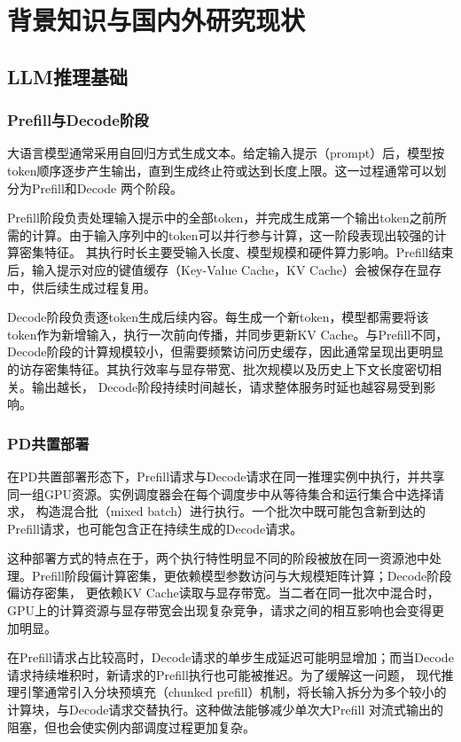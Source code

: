 
\chapter{背景知识与国内外研究现状}
\label{ch:background}

\section{LLM推理基础}

\subsection{Prefill与Decode阶段}

大语言模型通常采用自回归方式生成文本。给定输入提示（prompt）后，模型按token顺序逐步产生输出，直到生成终止符或达到长度上限。这一过程通常可以划分为Prefill和Decode
两个阶段。

Prefill阶段负责处理输入提示中的全部token，并完成生成第一个输出token之前所需的计算。由于输入序列中的token可以并行参与计算，这一阶段表现出较强的计算密集特征。
其执行时长主要受输入长度、模型规模和硬件算力影响。Prefill结束后，输入提示对应的键值缓存（Key-Value Cache，KV Cache）会被保存在显存中，供后续生成过程复用。

Decode阶段负责逐token生成后续内容。每生成一个新token，模型都需要将该token作为新增输入，执行一次前向传播，并同步更新KV Cache。与Prefill不同，
Decode阶段的计算规模较小，但需要频繁访问历史缓存，因此通常呈现出更明显的访存密集特征。其执行效率与显存带宽、批次规模以及历史上下文长度密切相关。输出越长，
Decode阶段持续时间越长，请求整体服务时延也越容易受到影响。

\subsection{PD共置部署}

在PD共置部署形态下，Prefill请求与Decode请求在同一推理实例中执行，并共享同一组GPU资源。实例调度器会在每个调度步中从等待集合和运行集合中选择请求，
构造混合批（mixed batch）进行执行。一个批次中既可能包含新到达的Prefill请求，也可能包含正在持续生成的Decode请求。

这种部署方式的特点在于，两个执行特性明显不同的阶段被放在同一资源池中处理。Prefill阶段偏计算密集，更依赖模型参数访问与大规模矩阵计算；Decode阶段偏访存密集，
更依赖KV Cache读取与显存带宽。当二者在同一批次中混合时，GPU上的计算资源与显存带宽会出现复杂竞争，请求之间的相互影响也会变得更加明显。

在Prefill请求占比较高时，Decode请求的单步生成延迟可能明显增加；而当Decode请求持续堆积时，新请求的Prefill执行也可能被推迟。为了缓解这一问题，
现代推理引擎通常引入分块预填充（chunked prefill）机制，将长输入拆分为多个较小的计算块，与Decode请求交替执行。这种做法能够减少单次大Prefill
对流式输出的阻塞，但也会使实例内部调度过程更加复杂。

